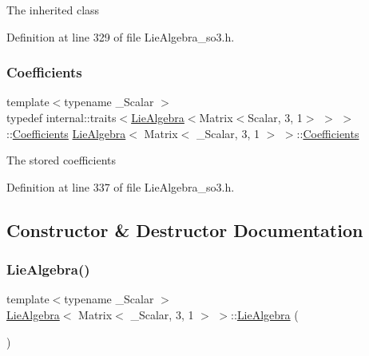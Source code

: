 The inherited class 

Definition at line 329 of file Lie\+Algebra\+\_\+so3.\+h.

\hypertarget{class_lie_algebra_3_01_matrix_3_01___scalar_00_013_00_011_01_4_01_4_a028504a0d794d492dc47b2edd056fe47}{}\label{class_lie_algebra_3_01_matrix_3_01___scalar_00_013_00_011_01_4_01_4_a028504a0d794d492dc47b2edd056fe47} 
\subsubsection{\texorpdfstring{Coefficients}{Coefficients}}
{\footnotesize\ttfamily template$<$typename \+\_\+\+Scalar $>$ \\
typedef internal\+::traits$<$\hyperlink{class_lie_algebra}{Lie\+Algebra}$<$Matrix$<$Scalar, 3, 1$>$ $>$ $>$\+::\hyperlink{class_lie_algebra_3_01_matrix_3_01___scalar_00_013_00_011_01_4_01_4_a028504a0d794d492dc47b2edd056fe47}{Coefficients} \hyperlink{class_lie_algebra}{Lie\+Algebra}$<$ Matrix$<$ \+\_\+\+Scalar, 3, 1 $>$ $>$\+::\hyperlink{class_lie_algebra_3_01_matrix_3_01___scalar_00_013_00_011_01_4_01_4_a028504a0d794d492dc47b2edd056fe47}{Coefficients}}

The stored coefficients 

Definition at line 337 of file Lie\+Algebra\+\_\+so3.\+h.



\subsection{Constructor \& Destructor Documentation}
\hypertarget{class_lie_algebra_3_01_matrix_3_01___scalar_00_013_00_011_01_4_01_4_a34165d53d90245bdbba7ccc7166fc37c}{}\label{class_lie_algebra_3_01_matrix_3_01___scalar_00_013_00_011_01_4_01_4_a34165d53d90245bdbba7ccc7166fc37c} 
\subsubsection{\texorpdfstring{Lie\+Algebra()}{LieAlgebra()}\hspace{0.1cm}{\footnotesize\ttfamily [1/5]}}
{\footnotesize\ttfamily template$<$typename \+\_\+\+Scalar $>$ \\
\hyperlink{class_lie_algebra}{Lie\+Algebra}$<$ Matrix$<$ \+\_\+\+Scalar, 3, 1 $>$ $>$\+::\hyperlink{class_lie_algebra}{Lie\+Algebra} (\begin{DoxyParamCaption}{ }\end{DoxyParamCaption})\hspace{0.3cm}{\ttfamily [inline]}}

